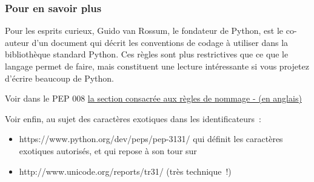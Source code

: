     \hypertarget{pour-en-savoir-plus}{%
\subsubsection{Pour en savoir plus}\label{pour-en-savoir-plus}}

    Pour les esprits curieux, Guido van Rossum, le fondateur de Python, est
le co-auteur d'un document qui décrit les conventions de codage à
utiliser dans la bibliothèque standard Python. Ces règles sont plus
restrictives que ce que le langage permet de faire, mais constituent une
lecture intéressante si vous projetez d'écrire beaucoup de Python.

Voir dans le PEP 008
\href{http://legacy.python.org/dev/peps/pep-0008/\#descriptive-naming-styles}{la
section consacrée aux règles de nommage - (en anglais)}

    Voir enfin, au sujet des caractères exotiques dans les identificateurs~:

\begin{itemize}
\tightlist
\item
  https://www.python.org/dev/peps/pep-3131/ qui définit les caractères
  exotiques autorisés, et qui repose à son tour sur
\item
  http://www.unicode.org/reports/tr31/ (très technique~!)
\end{itemize}


    
    
    
